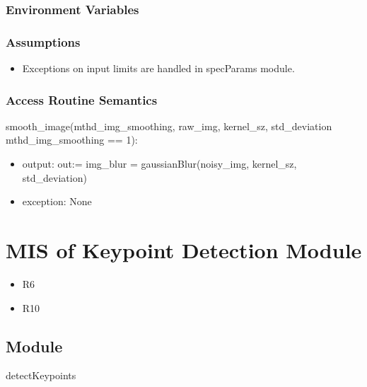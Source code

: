 \documentclass[12pt, titlepage]{article}
\begin{document}
\subsubsection{Environment Variables}

\subsubsection{Assumptions}
  \begin{itemize}
  \item Exceptions on input limits are handled in specParams module.
  \end{itemize}

\subsubsection{Access Routine Semantics}

\noindent smooth\_image(mthd\_img\_smoothing, raw\_img, 
kernel\_sz, std\_deviation \textbar \: mthd\_img\_smoothing == 1):
\begin{itemize}
\item output: out:= img\_blur = gaussianBlur(noisy\_img, 
  kernel\_sz, std\_deviation)
\end{itemize}

\begin{itemize}
\item exception: None
\end{itemize}




\section{MIS of Keypoint Detection Module} \label{mKD}
\begin{itemize}
  \item R6
  \item R10
\end{itemize}

\subsection{Module}

detectKeypoints
\end{document}
